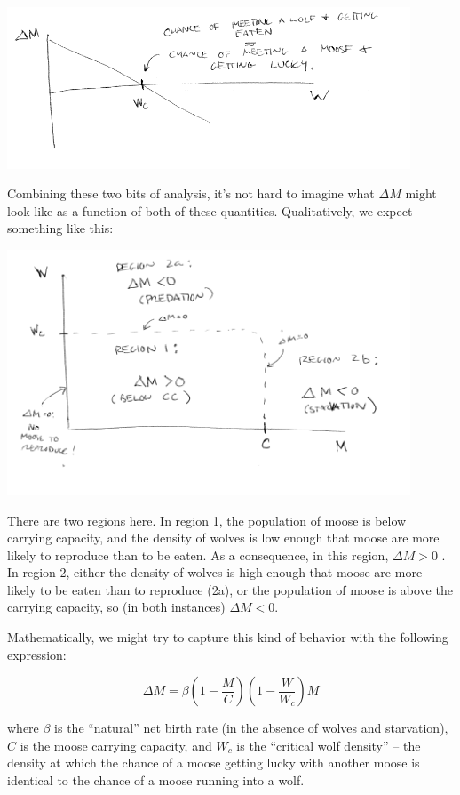 \includegraphics[width=12cm]{figs/DeltaMvsW}


Combining these two bits of analysis, it's not hard to imagine what $\Delta M$ might look like as a function of both of these quantities. Qualitatively, we expect something like this:


\includegraphics[width=12cm]{figs/DeltaMPhasePlane}


There are two regions here.  In region 1, the population of moose is below carrying capacity, and the density of wolves is low enough that moose are more likely to reproduce than to be eaten.  As a consequence, in this region, $\Delta M >0$ .  In region 2, either the density of wolves is high enough that moose are more likely to be eaten than to reproduce (2a), or the population of moose is above the carrying capacity, so (in both instances) $\Delta M<0$. 

Mathematically, we might try to capture this kind of behavior with the following expression:

$$\Delta M = \beta(1-\frac{M}{C})(1-\frac{W}{W_c})M$$

where $\beta$ is the ``natural'' net birth rate (in the absence of wolves and starvation), $C$ is the moose carrying capacity, and $W_c$ is the ``critical wolf density'' -- the density at which the chance of a moose getting lucky with another moose is identical to the chance of a moose running into a wolf.

